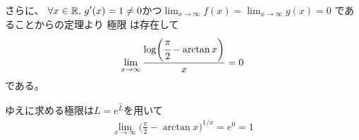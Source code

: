 \begin{ans*}
\begin{enumerate}[label=(\arabic*)]
    さらに、
    $\displaystyle\forall x\in\mathbb{R},\,\displaystyle g'(x) = 1 \neq 0$かつ$ \lim_{x\to\infty}f(x) = \lim_{x\to\infty}g(x) = 0$
    であることから\lhopital の定理より
    極限
    は存在して
    \begin{gather}
      \lim_{x\to\infty}\frac{\log\biggl( \cfrac{\pi}{2} - \arctan x \biggr)}{x}
      = 0
    \end{gather}
    である。

    ゆえに求める極限は$L = e^{\hat{L}}$を用いて
    \begin{align}
      \lim_{x\to\infty}\biggl( \frac{\pi}{2} - \arctan x \biggr)^{1/x}
      = e^0 = 1
    \end{align}
  \end{enumerate}
\end{ans*}

